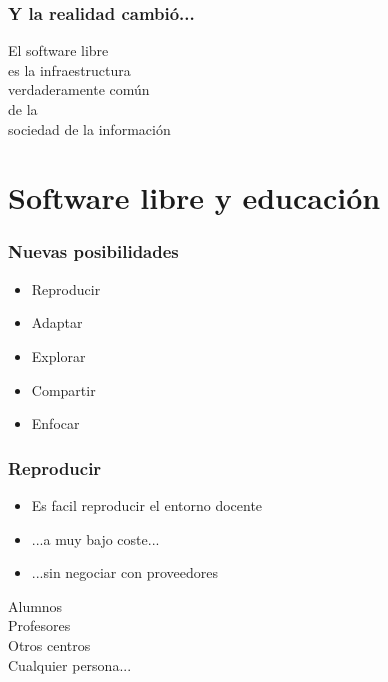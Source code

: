 \documentclass[17pt,aspectratio=169]{beamer}
\begin{document}

\begin{frame}
\frametitle{Y la realidad cambió...}

{\Large
\begin{center}
  El software libre \\
  es la infraestructura \\
  verdaderamente común \\
  de la \\
  sociedad de la información \\
\end{center}
}
\end{frame}

\section{Software libre y educación}


\begin{frame}
\frametitle{Nuevas posibilidades}

\begin{itemize}
  \item Reproducir
\item Adaptar
\item Explorar
\item Compartir
\item Enfocar
\end{itemize}

\end{frame}


\begin{frame}
\frametitle{Reproducir}

\begin{itemize}
\item Es facil reproducir el entorno docente
\item ...a muy bajo coste...
\item ...sin negociar con proveedores
\end{itemize}

\begin{flushright}
  Alumnos \\
  Profesores \\
  Otros centros \\
  Cualquier persona... \\
\end{flushright}
\end{frame}
\end{document}
